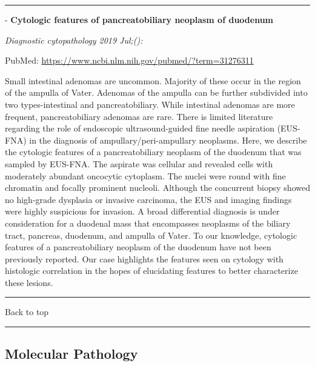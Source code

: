 \documentclass[]{article}
\begin{document}
\begin{center}\rule{0.5\linewidth}{\linethickness}\end{center}

 - \textbf{Cytologic features of pancreatobiliary neoplasm of duodenum}

\emph{Diagnostic cytopathology 2019 Jul;():}

PubMed: \url{https://www.ncbi.nlm.nih.gov/pubmed/?term=31276311}

Small intestinal adenomas are uncommon. Majority of these occur in the
region of the ampulla of Vater. Adenomas of the ampulla can be further
subdivided into two types-intestinal and pancreatobiliary. While
intestinal adenomas are more frequent, pancreatobiliary adenomas are
rare. There is limited literature regarding the role of endoscopic
ultrasound-guided fine needle aspiration (EUS-FNA) in the diagnosis of
ampullary/peri-ampullary neoplasms. Here, we describe the cytologic
features of a pancreatobiliary neoplasm of the duodenum that was sampled
by EUS-FNA. The aspirate was cellular and revealed cells with moderately
abundant oncocytic cytoplasm. The nuclei were round with fine chromatin
and focally prominent nucleoli. Although the concurrent biopsy showed no
high-grade dysplasia or invasive carcinoma, the EUS and imaging findings
were highly suspicious for invasion. A broad differential diagnosis is
under consideration for a duodenal mass that encompasses neoplasms of
the biliary tract, pancreas, duodenum, and ampulla of Vater. To our
knowledge, cytologic features of a pancreatobiliary neoplasm of the
duodenum have not been previously reported. Our case highlights the
features seen on cytology with histologic correlation in the hopes of
elucidating features to better characterize these lesions.

{}

{}

\begin{center}\rule{0.5\linewidth}{\linethickness}\end{center}

Back to top

\begin{center}\rule{0.5\linewidth}{\linethickness}\end{center}

\pagebreak

\hypertarget{molecular-pathology}{%
\subsection{Molecular Pathology}\label{molecular-pathology}}
\end{document}
